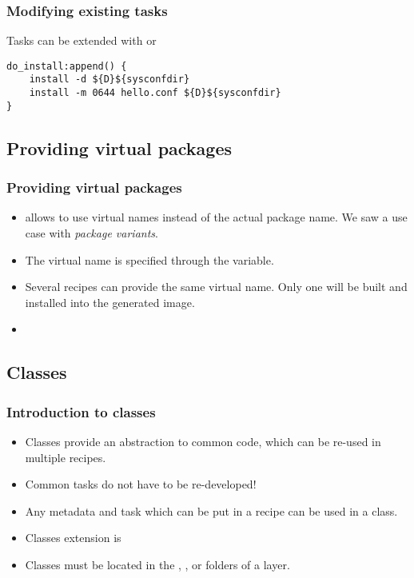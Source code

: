 \begin{frame}[fragile]
  \frametitle{Modifying existing tasks}
  Tasks can be extended with  or 
  \begin{block}{}
    \begin{verbatim}
do_install:append() {
    install -d ${D}${sysconfdir}
    install -m 0644 hello.conf ${D}${sysconfdir}
}
    \end{verbatim}
  \end{block}
\end{frame}

\subsection{Providing virtual packages}

\begin{frame}
  \frametitle{Providing virtual packages}
  \begin{itemize}
    \item {} allows to use virtual names instead of the actual
          package name. We saw a use case with \emph{package
          variants}.
    \item The virtual name is specified through the 
          variable.
    \item Several recipes can provide the same virtual name. Only one
          will be built and installed into the generated image.
    \item {}
  \end{itemize}
\end{frame}

\subsection{Classes}

\begin{frame}
  \frametitle{Introduction to classes}
  \begin{itemize}
    \item Classes provide an abstraction to common code, which can be
          re-used in multiple recipes.
    \item Common tasks do not have to be re-developed!
    \item Any metadata and task which can be put in a recipe can be
          used in a class.
    \item Classes extension is 
    \item Classes must be located in the ,
      , or  folders of a layer.
  \end{itemize}
\end{frame}

